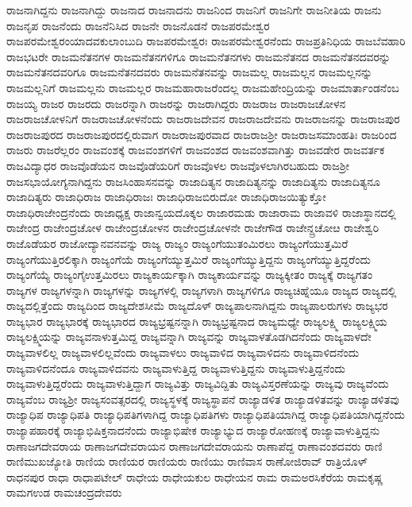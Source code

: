 {ರಾಜನಾಗಿದ್ದನು
ರಾಜನಾಗಿದ್ದು
ರಾಜನಾದ
ರಾಜನಾದನು
ರಾಜನಿಂದ
ರಾಜನಿಗೆ
ರಾಜನಿಗೇ
ರಾಜನೀತಿಯ
ರಾಜನು
ರಾಜನೃಪ
ರಾಜನೆಂದು
ರಾಜನೆನಿಸಿದ
ರಾಜನೇ
ರಾಜನೊಡನೆ
ರಾಜಪರಮೇಶ್ವರ
ರಾಜಪರಮೇಶ್ವರಂಯಾದವಕುಲಾಂಬುದಿ
ರಾಜಪರಮೇಶ್ವರಃ
ರಾಜಪರಮೇಶ್ವರನೆಂದು
ರಾಜಪ್ರತಿನಿಧಿಯ
ರಾಜಬೆವಹಾರಿ
ರಾಜಭಟರೇ
ರಾಜಮನೆತನಗಳ
ರಾಜಮನೆತನಗಳಿಗೂ
ರಾಜಮನೆತನಗಳು
ರಾಜಮನೆತನದ
ರಾಜಮನೆತನದವರನ್ನು
ರಾಜಮನೆತನದವರಿಗೂ
ರಾಜಮನೆತನದವರು
ರಾಜಮನೆತನವನ್ನು
ರಾಜಮಲ್ಲ
ರಾಜಮಲ್ಲನ
ರಾಜಮಲ್ಲನನ್ನು
ರಾಜಮಲ್ಲನಿಗೆ
ರಾಜಮಲ್ಲನು
ರಾಜಮಲ್ಲರ
ರಾಜಮಹಾರಾಜರೆಂದಲ್ಲ
ರಾಜಮಹೇಂದ್ರಿಯನ್ನು
ರಾಜಮಾರ್ತಾಂಡನೆಂಬ
ರಾಜಯ್ಯ
ರಾಜರ
ರಾಜರದು
ರಾಜರನ್ನಾಗಿ
ರಾಜರನ್ನು
ರಾಜರಾಗಿದ್ದರು
ರಾಜರಾಜ
ರಾಜರಾಜಚೋಳನ
ರಾಜರಾಜಚೋಳನಿಗೆ
ರಾಜರಾಜಚೋಳನೆಂದು
ರಾಜರಾಜದೇವನ
ರಾಜರಾಜದೇವನು
ರಾಜರಾಜನನ್ನು
ರಾಜರಾಜಪುರ
ರಾಜರಾಜಪುರದ
ರಾಜರಾಜಪುರದಲ್ಲಿರುವಾಗ
ರಾಜರಾಜಪುರವಾದ
ರಾಜರಾಜಶ್ರೀ
ರಾಜರಾಜಸಮಾಂಹತಿಃ
ರಾಜರಿಂದ
ರಾಜರು
ರಾಜರೆಲ್ಲರಂ
ರಾಜವಂಶಕ್ಕೆ
ರಾಜವಂಶಗಳಿಗೆ
ರಾಜವಂಶದ
ರಾಜವಂಶವಾಗಿತ್ತು
ರಾಜವಡೇರ
ರಾಜವರ್ತಕ
ರಾಜವಿದ್ಯಾಧರ
ರಾಜವೊಡೆಯನ
ರಾಜವೊಡೆಯರಿಗೆ
ರಾಜವೊಳಲ
ರಾಜವೊಳಲಾಗಿರಬಹುದು
ರಾಜಶ್ರೀ
ರಾಜಸಭಾಯೋಗ್ಯನಾಗಿದ್ದನು
ರಾಜಸಿಂಹಾಸನವನ್ನು
ರಾಜಾದಿತ್ಯನ
ರಾಜಾದಿತ್ಯನನ್ನು
ರಾಜಾದಿತ್ಯನು
ರಾಜಾದಿತ್ಯನೂ
ರಾಜಾದಿತ್ಯರು
ರಾಜಾಧಿರಾಜ
ರಾಜಾಧಿರಾಜಃ
ರಾಜಾಧಿರಾಜಬಿರುದೋ
ರಾಜಾಧಿರಾಜಯಿತ್ಯುಕ್ತೋ
ರಾಜಾಧಿರಾಜೇಂದ್ರನೆಂದು
ರಾಜಾಧ್ಯಕ್ಷ
ರಾಜಾನ್ವಯದೊಕ್ಕಲ
ರಾಜಾರಮಡು
ರಾಜಾರಾಮ
ರಾಜಾವಳಿ
ರಾಜಾಸ್ಥಾನದಲ್ಲಿ
ರಾಜೇಂದ್ರ
ರಾಜೇಂದ್ರಚೋಳ
ರಾಜೇಂದ್ರಚೋಳನ
ರಾಜೇಂದ್ರಚೋಳನೇ
ರಾಜೇಗೌಡ
ರಾಜೇನ್ದ್ರಚೋೞ
ರಾಜೇಶ್ವರಿ
ರಾಜೊಡೆಯರ
ರಾಜೋದ್ಯಾನವನವನ್ನು
ರಾಜ್ಯ
ರಾಜ್ಯಂ
ರಾಜ್ಯಂಗೆಯುತಂಮಿರಲು
ರಾಜ್ಯಂಗೆಯುತ್ತಮಿರೆ
ರಾಜ್ಯಂಗೆಯುತ್ತಿರಲಿಕ್ಕಾಗಿ
ರಾಜ್ಯಂಗೆಯೆ
ರಾಜ್ಯಂಗೆಯ್ಯುತ್ತಮಿರೆ
ರಾಜ್ಯಂಗೆಯ್ಯುತ್ತಿದ್ದನು
ರಾಜ್ಯಂಗೆಯ್ಯುತ್ತಿದ್ದರೆಂದು
ರಾಜ್ಯಂಗೆಯ್ಯೆ
ರಾಜ್ಯಂಗೈಉತ್ತಮಿರಲು
ರಾಜ್ಯಕಾರ್ಯಕ್ಕಾಗಿ
ರಾಜ್ಯಕಾರ್ಯವನ್ನು
ರಾಜ್ಯಕ್ಕೀತಂ
ರಾಜ್ಯಕ್ಕೆ
ರಾಜ್ಯಗತಂ
ರಾಜ್ಯಗಳ
ರಾಜ್ಯಗಳನ್ನಾಗಿ
ರಾಜ್ಯಗಳನ್ನು
ರಾಜ್ಯಗಳಲ್ಲಿ
ರಾಜ್ಯಗಳಾಗಿ
ರಾಜ್ಯಗಳಿಗೂ
ರಾಜ್ಯಚಿಹ್ನೆಯೂ
ರಾಜ್ಯದ
ರಾಜ್ಯದಲ್ಲಿ
ರಾಜ್ಯದಲ್ಲಿತ್ತೆಂದು
ರಾಜ್ಯದಿಂದ
ರಾಜ್ಯದೇಶಸೀಮೆ
ರಾಜ್ಯದೊಳ್
ರಾಜ್ಯಪಾಲನಾಗಿದ್ದನು
ರಾಜ್ಯಪಾಲರುಗಳು
ರಾಜ್ಯಭರ
ರಾಜ್ಯಭಾರ
ರಾಜ್ಯಭಾರಕ್ಕೆ
ರಾಜ್ಯಭಾರದ
ರಾಜ್ಯಭ್ರಷ್ಟನನ್ನಾಗಿ
ರಾಜ್ಯಭ್ರಷ್ಟನಾದ
ರಾಜ್ಯಮಧ್ಯೇ
ರಾಜ್ಯಲಕ್ಷ್ಮಿ
ರಾಜ್ಯಲಕ್ಷ್ಮಿಯ
ರಾಜ್ಯಲಕ್ಷ್ಮಿಯನ್ನು
ರಾಜ್ಯವನಾಳುತ್ತಮಿದ್ದ
ರಾಜ್ಯವನ್ನಾಗಿ
ರಾಜ್ಯವನ್ನು
ರಾಜ್ಯವಾಳತೊಡಗಿದನೆಂದು
ರಾಜ್ಯವಾಳದೇ
ರಾಜ್ಯವಾಳಲಿಲ್ಲ
ರಾಜ್ಯವಾಳಲಿಲ್ಲವೆಂದು
ರಾಜ್ಯವಾಳಲು
ರಾಜ್ಯವಾಳಿದ
ರಾಜ್ಯವಾಳಿದನು
ರಾಜ್ಯವಾಳಿದನೆಂದು
ರಾಜ್ಯವಾಳಿದನೆಂದೂ
ರಾಜ್ಯವಾಳಿದವನು
ರಾಜ್ಯವಾಳುತ್ತಿದ್ದ
ರಾಜ್ಯವಾಳುತ್ತಿದ್ದನು
ರಾಜ್ಯವಾಳುತ್ತಿದ್ದನೆಂದು
ರಾಜ್ಯವಾಳುತ್ತಿದ್ದರೆಂದು
ರಾಜ್ಯವಾಳುತ್ತಿದ್ದಾಗ
ರಾಜ್ಯವಿತ್ತು
ರಾಜ್ಯವಿದ್ದಿತು
ರಾಜ್ಯವಿಸ್ತರಣೆಯನ್ನು
ರಾಜ್ಯವು
ರಾಜ್ಯವೆಂದು
ರಾಜ್ಯವೆಂಬ
ರಾಜ್ಯಶ್ರೀ
ರಾಜ್ಯಸಂವತ್ಸರದಲ್ಲಿ
ರಾಜ್ಯಸ್ಥಳಕ್ಕೆ
ರಾಜ್ಯಸ್ಥಾಪನೆ
ರಾಜ್ಯಾಡಳಿತ
ರಾಜ್ಯಾಡಳಿತವನ್ನು
ರಾಜ್ಯಾಡಳಿತವು
ರಾಜ್ಯಾಧಿಪ
ರಾಜ್ಯಾಧಿಪತಿ
ರಾಜ್ಯಾಧಿಪತಿಗಳಾಗಿದ್ದ
ರಾಜ್ಯಾಧಿಪತಿಗಳು
ರಾಜ್ಯಾಧಿಪತಿಯಾಗಿದ್ದ
ರಾಜ್ಯಾಧಿಪತಿಯಾಗಿದ್ದನೆಂದು
ರಾಜ್ಯಾಪಹಾರಕ್ಕೆ
ರಾಜ್ಯಾಭಿಷಿಕ್ತನಾದನೆಂದು
ರಾಜ್ಯಾಭಿಷೇಕ
ರಾಜ್ಯಾಭ್ಯುದ
ರಾಜ್ಯಾರೋಹಣಕ್ಕೆ
ರಾಜ್ಯಾವಾಳುತ್ತಿದ್ದನು
ರಾಣಾಜಗದೇವರಾಯ
ರಾಣಾಜಗದೇವರಾಯನ
ರಾಣಾಜಗದೇವರಾಯನು
ರಾಣಾಪೆದ್ದ
ರಾಣಾವಂಶದವರು
ರಾಣಿ
ರಾಣಿಮುಖಜ್ಯೋತಿ
ರಾಣಿಯ
ರಾಣಿಯರ
ರಾಣಿಯರು
ರಾಣಿಯು
ರಾಣಿವಾಸ
ರಾಣೋಜಿರಾವ್
ರಾತ್ರಿಯೊಳ್
ರಾಧನಪುರ
ರಾಧಾ
ರಾಧಾಪಟೇಲ್
ರಾಧೇಯ
ರಾಧೇಯಕುಲ
ರಾಧೇಯನ
ರಾಮ
ರಾಮಅರಸಿಕೆರೆಯ
ರಾಮಕೃಷ್ಣ
ರಾಮಗಉಡ
ರಾಮಚಂದ್ರದೇವರು
}
